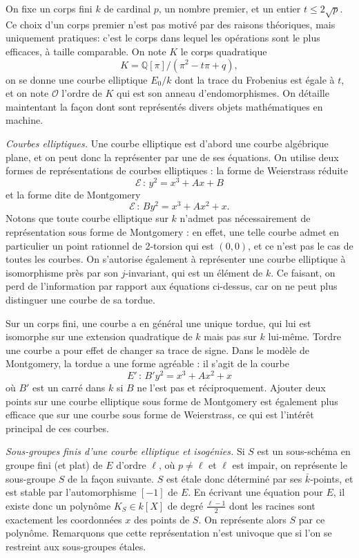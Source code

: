 \documentclass[11pt,a4paper]{article}
\newcommand{\Q}{\mathbb{Q}}
\newcommand{\E}{\mathcal{E}}
\renewcommand{\O}{\mathcal{O}}
\newcommand{\de}{\,:\,}
\renewcommand{\v}{\vspace{5mm}}
\theoremstyle{definition}
\begin{document}
On fixe un corps fini $k$ de cardinal $p$, un nombre premier, et un entier $t\leq 2\sqrt{p}$. Ce choix d'un corps premier n'est pas motivé par des raisons théoriques, mais uniquement pratiques: c'est le corps dans lequel les opérations sont le plus efficaces, à taille comparable. On note $K$ le corps quadratique
$$K = \Q[\pi] / (\pi^2 - t\pi + q),$$
on se donne une courbe elliptique $E_0/k$ dont la trace du Frobenius est égale à $t$, et on note $\O$ l'ordre de $K$ qui est son anneau d'endomorphismes. On détaille maintentant la façon dont sont représentés divers objets mathématiques \og en machine\fg.

\v

\emph{Courbes elliptiques.} Une courbe elliptique est d'abord une courbe algébrique plane, et on peut donc la représenter par une de ses équations. On utilise deux formes de représentations de courbes elliptiques : la forme de Weierstrass réduite
$$\E\de y^2 = x^3 + Ax + B$$
et la forme dite de Montgomery
$$\E\de B y^2 = x^3 + A x^2 + x.$$
Notons que toute courbe elliptique sur $k$ n'admet pas nécessairement de représentation sous forme de Montgomery : en effet, une telle courbe admet en particulier un point rationnel de 2-torsion qui est $(0,0)$, et ce n'est pas le cas de toutes les courbes.
On s'autorise également à représenter une courbe elliptique à isomorphisme près par son $j$-invariant, qui est un élément de $k$. Ce faisant, on perd de l'information par rapport aux équations ci-dessus, car on ne peut plus distinguer une courbe de sa tordue.

Sur un corps fini, une courbe a en général une unique tordue, qui lui est isomorphe sur une extension quadratique de $k$ mais pas sur $k$ lui-même. Tordre une courbe a pour effet de changer sa trace de signe. Dans le modèle de Montgomery, la tordue a une forme agréable : il s'agit de la courbe
$$E'\de B'y^2 = x^3 + Ax^2 + x$$
où $B'$ est un carré dans $k$ si $B$ ne l'est pas et réciproquement. Ajouter deux points sur une courbe elliptique sous forme de Montgomery est également plus efficace que sur une courbe sous forme de Weierstrass, ce qui est l'intérêt principal de ces courbes.
\v

\emph{Sous-groupes finis d'une courbe elliptique et isogénies.} Si $S$ est un sous-schéma en groupe fini (et plat) de $E$ d'ordre $\ell$, où $p\neq \ell$ et $\ell$ est impair, on représente le sous-groupe $S$ de la façon suivante. $S$ est étale donc déterminé par ses $\bar{k}$-points, et est stable par l'automorphisme $[-1]$ de $E$.
En écrivant une équation pour $E$, il existe donc un polynôme $K_S\in k[X]$ de degré $\frac{\ell-1}{2}$ dont les racines sont exactement les coordonnées $x$ des points de $S$. On représente alors $S$ par ce polynôme. Remarquons que cette représentation n'est univoque que si l'on se restreint aux sous-groupes étales.
\end{document}

